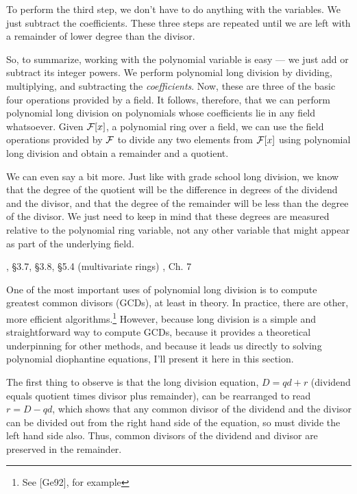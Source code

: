 To perform the third step, we don't have to do anything with
the variables.  We just subtract the coefficients.  These
three steps are repeated until we are left with a remainder
of lower degree than the divisor.

So, to summarize, working with the polynomial variable is easy --- we
just add or subtract its integer powers.  We perform polynomial long
division by dividing, multiplying, and subtracting the {\it
coefficients}.  Now, these are three of the basic four operations
provided by a field.  It follows, therefore, that we can perform
polynomial long division on polynomials whose coefficients lie in any
field whatsoever.  Given ${\cal F}[x]$, a polynomial ring over a
field, we can use the field operations provided by ${\cal F}$ to
divide any two elements from ${\cal F}[x]$ using polynomial long
division and obtain a remainder and a quotient.

We can even say a bit more.  Just like with grade school long
division, we know that the degree of the quotient will be the
difference in degrees of the dividend and the divisor, and that the
degree of the remainder will be less than the degree of the divisor.
We just need to keep in mind that these degrees are measured relative
to the polynomial ring variable, not any other variable that might
appear as part of the underlying field.

, \S3.7, \S3.8, \S5.4 (multivariate rings)\hfil\break
\hbox{}\qquad [Ge92], Ch. 7

One of the most important uses of polynomial long division is to
compute greatest common divisors (GCDs), at least in theory.  In
practice, there are other, more efficient algorithms.\footnote{See
[Ge92], for example} However, because long division is a simple and
straightforward way to compute GCDs, because it provides a theoretical
underpinning for other methods, and because it leads us directly to
solving polynomial diophantine equations, I'll present it here in this
section.

The first thing to observe is that the long division equation, $D = qd
+ r$ (dividend equals quotient times divisor plus remainder), can be
rearranged to read $r = D - qd$, which shows that any common divisor
of the dividend and the divisor can be divided out from the right hand
side of the equation, so must divide the left hand side also.  Thus,
common divisors of the dividend and divisor are preserved in the
remainder.

